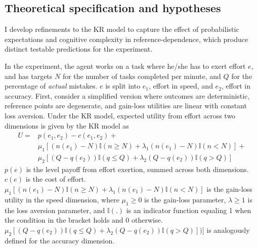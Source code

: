 \documentclass[12pt, letterpaper, DIV=11, numbers=noendperiod]{article}
\begin{document}
\subsection{Theoretical specification and hypotheses}\label{theoretical-specification-and-hypotheses}

I develop refinements to the KR model to capture the effect of probabilistic expectations and cognitive complexity in reference-dependence, which produce distinct testable predictions for the experiment.

In the experiment, the agent works on a task where he/she has to exert effort \(e\), and has targets \(N\) for the number of tasks completed per minute, and \(Q\) for the percentage of \emph{actual} mistakes. \(e\) is split into \(e_1\), effort in speed, and \(e_2\), effort in accuracy. First, consider a simplified version where outcomes are deterministic, reference points are degenerate, and gain-loss utilities are linear with constant loss aversion. Under the KR model, expected utility from effort across two dimensions is given by the KR model as
\[
\begin{aligned}
U = & p(e_1, e_2) - c(e_1, e_2) + \nonumber \\
    & \mu_1[(n(e_1)-N)\mathbb{I}(n \geq N) + \lambda_1(n(e_1)-N)\mathbb{I}(n<N)] + \nonumber \\
    & \mu_2[(Q-q(e_2))\mathbb{I}(q \leq Q) + \lambda_2(Q-q(e_2))\mathbb{I}(q>Q)]
\end{aligned}
\]
\(p(e)\) is the level payoff from effort exertion, summed across both dimensions. \(c(e)\) is the cost of effort. \(\mu_1[(n(e_1)-N)\mathbb{I}(n \geq N) + \lambda_1(n(e_1)-N)\mathbb{I}(n<N)]\) is the gain-loss utility in the speed dimension, where \(\mu_1 \geq 0\) is the gain-loss parameter, \(\lambda \geq 1\) is the loss aversion parameter, and \(\mathbb{I}(.)\) is an indicator function equaling 1 when the condition in the bracket holds and 0 otherwise. \(\mu_2 [(Q-q(e_2))\mathbb{I}(q \leq Q) + \lambda_2(Q-q(e_2))\mathbb{I}(q>Q)])]\) is analogously defined for the accuracy dimension.
\end{document}

